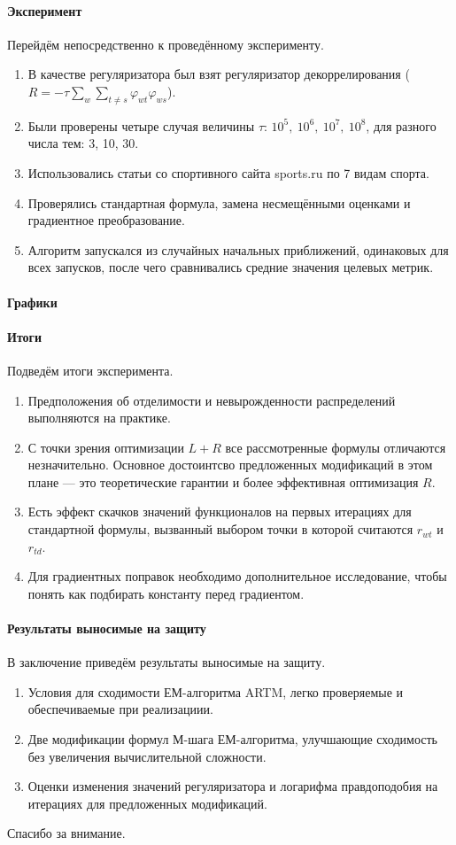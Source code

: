 \documentclass[12pt]{article}
\renewcommand{\phi}{\varphi}
\begin{document}
\paragraph{Эксперимент}
Перейдём непосредственно к проведённому эксперименту.
\begin{enumerate}
\item В качестве регуляризатора был взят регуляризатор декоррелирования ($R = -\tau\sum\limits_w \sum\limits_{t \neq s} \phi_{wt} \phi_{ws}$).
\item Были проверены четыре случая величины $\tau$: $10^5,~10^6,~10^7,~10^8$, для разного числа тем: 3, 10, 30.
\item Использовались статьи со спортивного сайта sports.ru по 7 видам спорта.
\item Проверялись стандартная формула, замена несмещёнными оценками и градиентное преобразование.
\item Алгоритм  запускался из случайных начальных приближений, одинаковых для всех запусков, после чего сравнивались средние значения целевых метрик.
\end{enumerate}

\paragraph{Графики}

\paragraph{Итоги}
Подведём итоги эксперимента.
\begin{enumerate}
\item Предположения об отделимости и невырожденности распределений выполняются на практике.
\item С точки зрения оптимизации $L +  R$ все рассмотренные формулы отличаются незначительно. Основное достоинтсво предложенных модификаций в этом плане --- это теоретические гарантии и более эффективная оптимизация $R$.
\item Есть эффект скачков значений функционалов на первых итерациях для стандартной формулы, вызванный выбором точки в которой считаются $r_{wt}$ и $r_{td}$.
\item Для градиентных поправок необходимо дополнительное исследование, чтобы понять как подбирать константу перед градиентом.
\end{enumerate}

\paragraph{Результаты выносимые на защиту}
В заключение приведём результаты выносимые на защиту.
\begin{enumerate}
\item Условия для сходимости ЕМ-алгоритма ARTM, легко проверяемые и обеспечиваемые при реализациии.
\item Две модификации формул М-шага ЕМ-алгоритма, улучшающие сходимость без увеличения вычислительной сложности.
\item Оценки изменения значений регуляризатора и логарифма правдоподобия на итерациях для предложенных модификаций.
\end{enumerate}
Спасибо за внимание.
\end{document}
